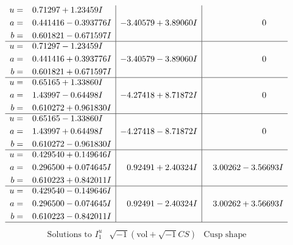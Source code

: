 \documentclass[1p]{elsarticle_modified}
\theoremstyle{definition}
\newcommand{\I}{\sqrt{-1}}
\begin{document}
$$\begin{array}{c|c|c}
\begin{aligned}
u &= \phantom{-}0.71297 + 1.23459 I \\
a &= \phantom{-}0.441416 - 0.393776 I \\
b &= \phantom{-}0.601821 - 0.671597 I\end{aligned}
 & -3.40579 + 3.89060 I & \phantom{-0.000000 } 0 \\ \hline\begin{aligned}
u &= \phantom{-}0.71297 - 1.23459 I \\
a &= \phantom{-}0.441416 + 0.393776 I \\
b &= \phantom{-}0.601821 + 0.671597 I\end{aligned}
 & -3.40579 - 3.89060 I & \phantom{-0.000000 } 0 \\ \hline\begin{aligned}
u &= \phantom{-}0.65165 + 1.33860 I \\
a &= \phantom{-}1.43997 - 0.64498 I \\
b &= \phantom{-}0.610272 + 0.961830 I\end{aligned}
 & -4.27418 + 8.71872 I & \phantom{-0.000000 } 0 \\ \hline\begin{aligned}
u &= \phantom{-}0.65165 - 1.33860 I \\
a &= \phantom{-}1.43997 + 0.64498 I \\
b &= \phantom{-}0.610272 - 0.961830 I\end{aligned}
 & -4.27418 - 8.71872 I & \phantom{-0.000000 } 0 \\ \hline\begin{aligned}
u &= \phantom{-}0.429540 + 0.149646 I \\
a &= \phantom{-}0.296500 + 0.074645 I \\
b &= \phantom{-}0.610223 + 0.842011 I\end{aligned}
 & \phantom{-}0.92491 + 2.40324 I & \phantom{-}3.00262 - 3.56693 I \\ \hline\begin{aligned}
u &= \phantom{-}0.429540 - 0.149646 I \\
a &= \phantom{-}0.296500 - 0.074645 I \\
b &= \phantom{-}0.610223 - 0.842011 I\end{aligned}
 & \phantom{-}0.92491 - 2.40324 I & \phantom{-}3.00262 + 3.56693 I\\
 \hline 
 \end{array}$$\newpage$$\begin{array}{c|c|c}  
\text{Solutions to }I^u_{1}& \I (\text{vol} + \sqrt{-1}CS) & \text{Cusp shape}\\

\end{array}$$
\end{document}
